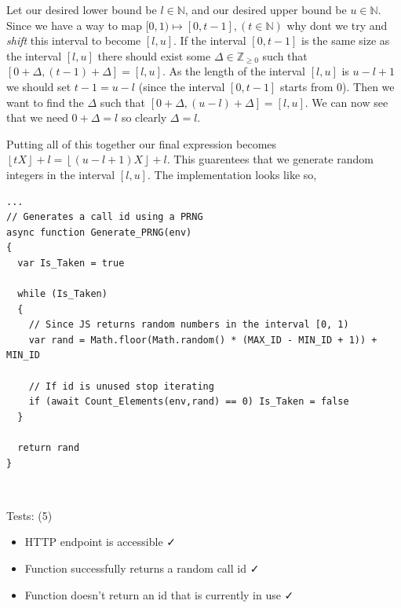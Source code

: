 Let our desired lower bound be $l \in \mathbb{N}$, and our desired upper
bound be $u \in \mathbb{N}$. Since we have a way to map $[0, 1) \mapsto
[0, t-1], (t \in \mathbb{N})$ why dont we try and \textit{shift}
this interval to become $[l, u]$. If the interval $[0, t-1]$ is the
same size as the interval $[l, u]$ there should exist some $\Delta \in \mathbb{Z}_{\geq 0}$
such that $[0 + \Delta, (t-1) + \Delta] = [l, u]$. As the length of the
interval $[l, u]$ is $u - l + 1$ we should set $t-1 = u - l$
(since the interval $[0, t-1]$ starts from 0). Then we want to find
the $\Delta$ such that $[0 + \Delta, (u - l) + \Delta] = [l, u]$.
We can now see that we need $0 + \Delta = l$ so clearly
$\Delta = l$. \\ \vspace{0.2cm}

Putting all of this together our final expression becomes
$\left \lfloor tX \right \rfloor +l = \left \lfloor (u - l + 1)X \right \rfloor + l$.
This guarentees that we generate random integers
in the interval $[l, u]$. The implementation looks like so,

\begin{verbatim}
...
// Generates a call id using a PRNG
async function Generate_PRNG(env)
{
  var Is_Taken = true

  while (Is_Taken)
  {
    // Since JS returns random numbers in the interval [0, 1)
    var rand = Math.floor(Math.random() * (MAX_ID - MIN_ID + 1)) + MIN_ID

    // If id is unused stop iterating
    if (await Count_Elements(env,rand) == 0) Is_Taken = false
  }

  return rand
}
\end{verbatim}

{\color{gray} \hrulefill} \\ \vspace{0.2cm}

{\sffamily Tests: (5)}

\begin{itemize}
  \item HTTP endpoint is accessible \faCheck \\
  \item Function successfully returns a random call id \faCheck \\
  \item Function doesn't return an id that is currently in use \faCheck \\
\end{itemize}

